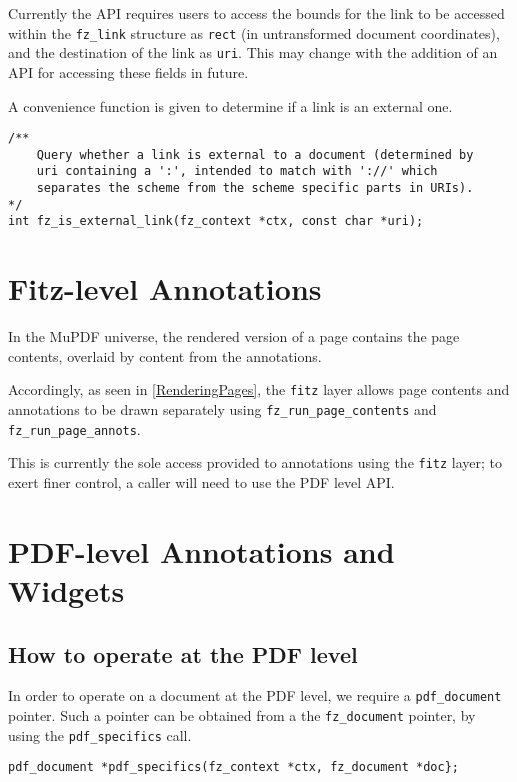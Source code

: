 \documentclass[oneside]{book}
\begin{document}
Currently the API requires users to access the bounds for the link to be accessed within the \texttt{fz\_link} structure as \texttt{rect} (in untransformed document coordinates), and the destination of the link as \texttt{uri}. This may change with the addition of an API for accessing these fields in future.

A convenience function is given to determine if a link is an external one.

\begin{lstlisting}
/**
	Query whether a link is external to a document (determined by
	uri containing a ':', intended to match with '://' which
	separates the scheme from the scheme specific parts in URIs).
*/
int fz_is_external_link(fz_context *ctx, const char *uri);
\end{lstlisting}

\section{Fitz-level Annotations}

In the MuPDF universe, the rendered version of a page contains the page contents, overlaid by content from the annotations.

Accordingly, as seen in \ref{RenderingPages}, the \texttt{fitz} layer allows page contents and annotations to be drawn separately using \texttt{fz\_run\_page\_contents} and \texttt{fz\_run\_page\_annots}.

This is currently the sole access provided to annotations using the \texttt{fitz} layer; to exert finer control, a caller will need to use the PDF level API.

\section{PDF-level Annotations and Widgets}

\subsection{How to operate at the PDF level}

In order to operate on a document at the PDF level, we require a \texttt{pdf\_document} pointer. Such a pointer can be obtained from a the \texttt{fz\_document} pointer, by using the \texttt{pdf\_specifics} call.

\begin{lstlisting}
pdf_document *pdf_specifics(fz_context *ctx, fz_document *doc};
\end{lstlisting}
\end{document}
